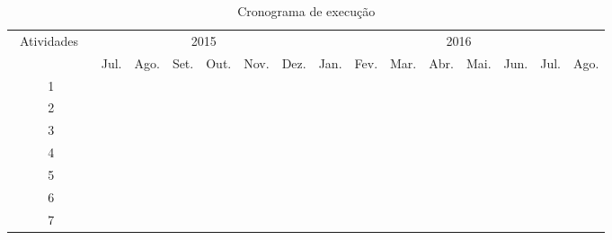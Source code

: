 \begin{table}[htbp]
\centering
\setlength{\tabcolsep}{0pt}
\begin{tabular}{|c|c|c|c|c|c|c|c|c|c|c|c|c|c|c|}
\hline
\multirow{2}{*}{ \ Atividades \ } & \multicolumn{6}{c|}{2015}               & \multicolumn{8}{c|}{2016} \\ \cline{2-15} 
                                  & Jul. & Ago. & Set. & Out. & Nov. & Dez. & Jan. & Fev. & Mar. & Abr. & Mai. & Jun. & Jul. & Ago. \\ \hline
1                                 & \x   & \x   & \x   &      &      &      &      &      &      &      &      &      &      &      \\ \hline
2                                 & \x   & \x   & \x   &      &      &      &      &      &      &      &      &      &      &     	\\ \hline
3                                 &      &      &      & \x   & \x   &      &      &      &      &      &      &      &      &     	\\ \hline
4                                 &      &      &      &      &      & \x   & \x   &      &      &      &      &      &      &     	\\ \hline
5                                 &      &      &      &      &      &      &      & \x   & \x   & \x   &      &      &      &     	\\ \hline
6                                 &      &      &      &      &      &      &      &      &      &      & \x   & \x   & \x   &     	\\ \hline
7                                 &      &      &      &      &      &      &      &      &      &      &      &      &      & \x  	\\ \hline
\end{tabular}
\caption{Cronograma de execução}
\label{tab:cronograma}
\end{table}